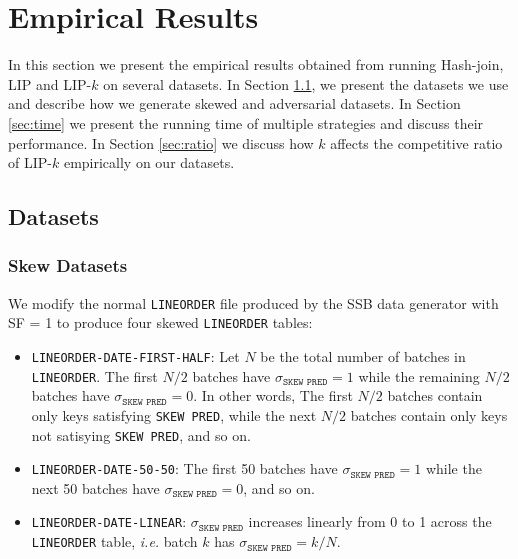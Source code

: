 \section{Empirical Results}\label{sec:experiment}

In this section we present the empirical results obtained from running Hash-join, LIP and LIP-$k$ on several datasets. In Section \ref{sec:dataset}, we present the datasets we use and describe how we generate skewed and adversarial datasets. In Section \ref{sec:time} we present the running time of multiple strategies and discuss their performance. In Section \ref{sec:ratio} we discuss how $k$ affects the competitive ratio of LIP-$k$ empirically on our datasets.

\subsection{Datasets}
\label{sec:dataset}


\subsubsection{Skew Datasets}

We modify the normal \texttt{LINEORDER} file produced by the SSB data generator with SF = 1 to produce four skewed \texttt{LINEORDER} tables: 


\begin{itemize}
    \item \texttt{LINEORDER-DATE-FIRST-HALF}: Let $N$ be the total number of batches in \texttt{LINEORDER}. 
    The first $N/2$ batches have $\sigma_{\texttt{SKEW PRED}} = 1$ while the remaining $N/2$ batches have $\sigma_{\texttt{SKEW PRED}} = 0$.
    In other words, The first $N/2$ batches contain only keys satisfying \texttt{SKEW PRED}, 
    while the next $N/2$ batches contain only keys not satisying \texttt{SKEW PRED}, 
    and so on. 

    \item \texttt{LINEORDER-DATE-50-50}: The first 50 batches have $\sigma_{\texttt{SKEW PRED}} = 1$ while the next 50 batches have $\sigma_{\texttt{SKEW PRED}} = 0$, and so on.

    \item \texttt{LINEORDER-DATE-LINEAR}: $\sigma_{\texttt{SKEW PRED}}$ increases linearly from 0 to 1 across the \texttt{LINEORDER} table, 
    {\it i.e.} batch $k$ has $\sigma_{\texttt{SKEW PRED}} = k/N$.
\end{itemize}

